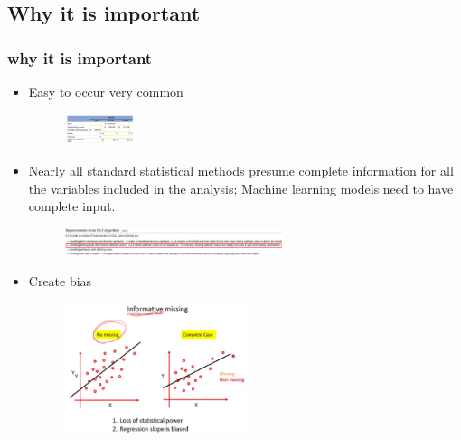 \documentclass{beamer}
\begin{document}
\subsection{Why it is important}
\fontsize{6pt}{7.2}\selectfont
\begin{frame}
\frametitle{why it is important}
\begin{itemize}
\item {Easy to occur very common}
\begin{figure}[h!]
	\includegraphics[width=0.2\textwidth]{missing.png}
\end{figure}
\item  Nearly all standard statistical methods presume complete information for
all the variables included in the analysis; Machine learning models need to have complete input.\cite{p1}
\begin{figure}[h!]
	\includegraphics[width=0.6\textwidth]{c45.png}
\end{figure}
\item Create bias \cite{p2}
\begin{figure}[h!]
	\includegraphics[width=0.5\textwidth]{bias.png}
\end{figure}
\end{itemize}
\end{frame}

\end{document}
